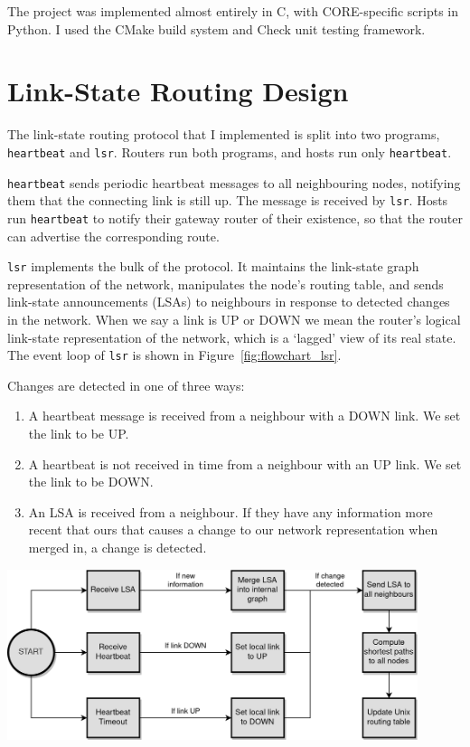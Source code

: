 \documentclass[withindex,glossary,openany]{cam-thesis}
\begin{document}
The project was implemented almost entirely in C, with CORE-specific scripts in Python. I used the CMake build system and Check unit testing framework.

\section{Link-State Routing Design}

The link-state routing protocol that I implemented is split into two programs, \texttt{heartbeat} and \texttt{lsr}.  Routers run both programs, and hosts run only \texttt{heartbeat}.

\texttt{heartbeat} sends periodic heartbeat messages to all neighbouring nodes, notifying them that the connecting link is still up. The message is received by \texttt{lsr}. Hosts run \texttt{heartbeat} to notify their gateway router of their existence, so that the router can advertise the corresponding route.

\texttt{lsr} implements the bulk of the protocol. It maintains the link-state graph representation of the network, manipulates the node's routing table, and sends link-state announcements (LSAs) to neighbours in response to detected changes in the network. When we say a link is UP or DOWN we mean the router's logical link-state representation of the network, which is a `lagged' view of its real state. The event loop of \texttt{lsr} is shown in Figure~\ref{fig:flowchart_lsr}.

Changes are detected in one of three ways:
\begin{enumerate}
	\item
	A heartbeat message is received from a neighbour with a DOWN link. We set the link to be UP.
	
	\item
	A heartbeat is not received in time from a neighbour with an UP link. We set the link to be DOWN.
	
	\item
	An LSA is received from a neighbour. If they have any information more recent that ours that causes a change to our network representation when merged in, a change is detected.
\end{enumerate}

\begin{center}
\begin{minipage}{0.9\textwidth} \centering
	\includegraphics[width=0.9\textwidth]{flowchart_lsr}
	\label{fig:flowchart_lsr}
\end{minipage}
\end{center}
\end{document}
